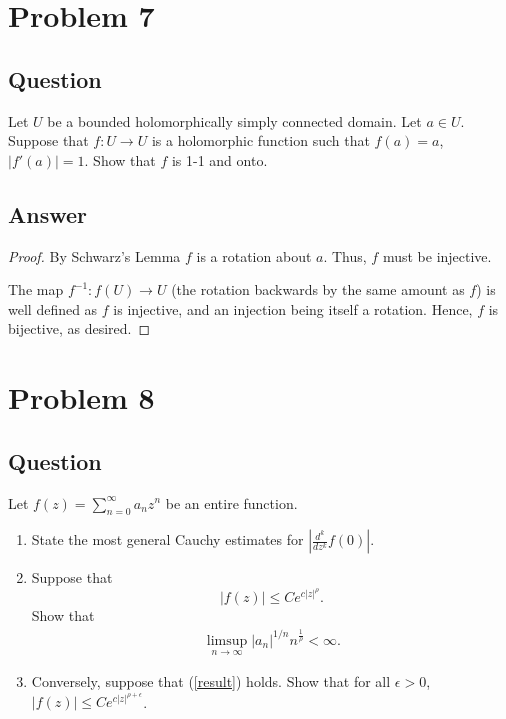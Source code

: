 \documentclass[11pt]{article}
\begin{document}
\section{Problem 7}
\subsection{Question}
Let $U$ be a bounded holomorphically simply connected domain. Let $a \in U$. Suppose that $f: U \to U$ is a holomorphic function  such that $f(a) = a$, $|f'(a)| = 1$. Show that $f$ is 1-1 and onto. 
\subsection{Answer}
\begin{proof}
By Schwarz's Lemma $f$ is a rotation about $a$. Thus, $f$ must be injective. 

The map $f^{-1}: f(U) \to U$ (the rotation backwards by the same amount as $f$) is  well defined as $f$ is injective, and an injection being itself a rotation. Hence, $f$ is bijective, as desired.
\end{proof}


\section{Problem 8}
\subsection{Question}
Let $f(z) = \sum_{n=0}^\infty a_n z^n$ be an entire function.
\begin{enumerate}
\item State the most general Cauchy estimates for $|\frac{d^k}{dz^k} f(0)|$.
\item Suppose that 
\[|f(z)| \leq Ce^{c|z| ^\rho}.\]
Show that
\begin{align} \label{result} \limsup_{n \to \infty} |a_n| ^{1/n} n^{\frac{1}{\rho}}< \infty.\end{align}
\item Conversely, suppose that (\ref{result}) holds. Show that for all $\epsilon > 0$, $|f(z) | \leq Ce^{c|z|^{\rho + \epsilon}}$.
\end{enumerate}
\end{document}

